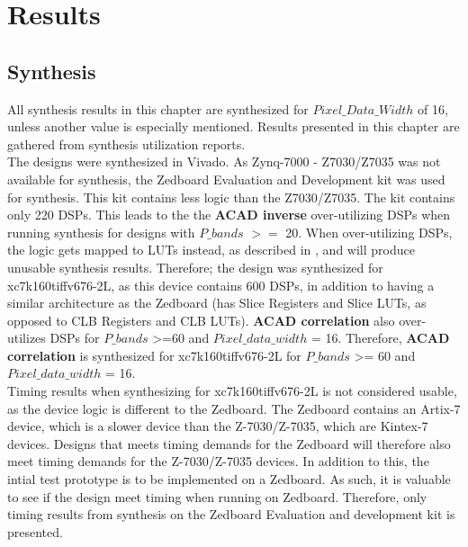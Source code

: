 \newpage
\chapter{Results}
\label{sec:results}
\section{Synthesis}
\label{sec:synthesis_results}
All synthesis results in this chapter are synthesized for $Pixel\_Data\_Width$ of 16, unless another value is 
especially mentioned. Results presented in this chapter are gathered from synthesis utilization reports.\\

The designs were synthesized in Vivado. As Zynq-7000 - Z7030/Z7035 was not available for synthesis, the Zedboard Evaluation and Development kit was used for synthesis. This kit contains less logic than the Z7030/Z7035. The kit contains only 220 DSPs. This leads to the the \textbf{ACAD inverse} over-utilizing DSPs when running synthesis for designs with $P\_bands$ $>=$ 20. When over-utilizing DSPs, the logic gets mapped to LUTs instead, as described in \cite{cite:dsp_overutilizing}, and will produce unusable synthesis results. Therefore; the design was synthesized for xc7k160tiffv676-2L, as this device contains 600 DSPs, in addition to having a similar architecture as the Zedboard (has Slice Registers and Slice LUTs, as opposed to CLB Registers and CLB LUTs). \textbf{ACAD correlation} also over-utilizes DSPs for $P\_bands$ >=60 and $Pixel\_data\_width$ = 16. Therefore, \textbf{ACAD correlation} is synthesized for xc7k160tiffv676-2L for $P\_bands$ >= 60 and $Pixel\_data\_width$ = 16.\\

Timing results when synthesizing for xc7k160tiffv676-2L is not considered usable, as the device logic is different to the Zedboard. The Zedboard contains an Artix-7 device, which is a slower device than the Z-7030/Z-7035, which are Kintex-7 devices. Designs that meets timing demands for the Zedboard will therefore also meet timing demands for the Z-7030/Z-7035 devices. In addition to this, the intial test prototype is to be implemented on a Zedboard. As such, it is valuable to see if the design meet timing when running on Zedboard. Therefore, only timing results from synthesis on the Zedboard Evaluation and development kit is presented. 




